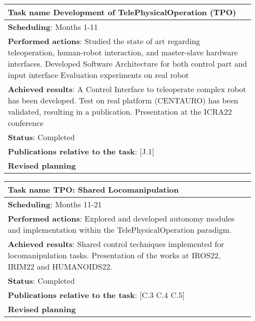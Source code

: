 \begin{table}[H]
	\begin{center}
		\renewcommand{\arraystretch}{1.3} %
		\setlength{\tabcolsep}{8pt} %
		\begin{tabular}{|P{15cm}|}
			\hline
			\textbf{Task name} Development of TelePhysicalOperation (TPO) \\ \hline
			\textbf{Scheduling}: Months 1-11 \\ \hline
			\textbf{Performed actions}: Studied the state of art regarding teleoperation, human-robot interaction, and master-slave hardware interfaces. 
			Developed Software Architecture for both control part and input interface 
			Evaluation experiments on real robot\\
			\hline
			\textbf{Achieved results}: A Control Interface to teleoperate complex robot has been developed. Test on real platform (CENTAURO) has been validated, resulting in a publication. Presentation at the ICRA22 conference \\
			\hline
			\textbf{Status}: Completed\\
			\hline
			\textbf{Publications relative to the task}: [J.1]\\
			\hline
			\textbf{Revised planning}\\
			\hline
		\end{tabular}
	\end{center}
\end{table}

\begin{table}[H]
	\begin{center}
		\renewcommand{\arraystretch}{1.3} %
		\setlength{\tabcolsep}{8pt} %
		\begin{tabular}{|P{15cm}|}
			\hline
			\textbf{Task name} TPO: Shared Locomanipulation \\ \hline
			\textbf{Scheduling}: Months 11-21 \\ \hline
			\textbf{Performed actions}: Explored and developed autonomy modules and implementation within the TelePhysicalOperation paradigm.\\
			\hline
			\textbf{Achieved results}: Shared control techniques implemented for locomanipulation tasks. Presentation of the works at IROS22, IRIM22 and HUMANOIDS22. \\
			\hline
			\textbf{Status}: Completed\\
			\hline
			\textbf{Publications relative to the task}: [C.3 C.4 C.5]\\
			\hline
			\textbf{Revised planning}\\
			\hline
		\end{tabular}
	\end{center}
\end{table}

